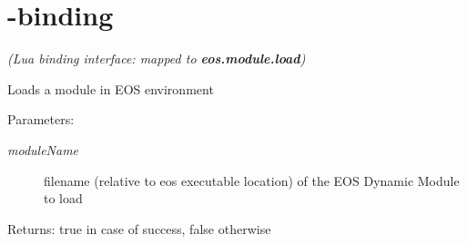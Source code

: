\hypertarget{group__lua}{
\section{-binding}
\label{group__lua}
}
{\em (Lua binding interface: mapped to {\bf eos.module.load})\/}\par
\par
 Loads a module in EOS environment \begin{Desc}
\item[Parameters:]
\begin{description}
\item[{\em moduleName}]filename (relative to eos executable location) of the EOS Dynamic Module to load \end{description}
\end{Desc}
\begin{Desc}
\item[Returns:]true in case of success, false otherwise \end{Desc}
